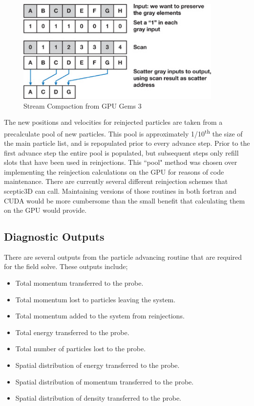 \begin{figure}
\begin{center}
\includegraphics[width=4in]{implementation/stream_compact.jpg}
\end{center}
\caption{Stream Compaction from GPU Gems 3 \cite{Harris2007}}
\label{fig:stream_compact}
\end{figure}



The new positions and velocities for reinjected particles are taken from a precalculate pool of new particles. This pool is approximately 1/10\textsuperscript{th} the size of the main particle list, and is repopulated prior to every advance step. Prior to the first advance step the entire pool is populated, but subsequent steps only refill slots that have been used in reinjections. This ``pool" method was chosen over implementing the reinjection calculations on the GPU for reasons of code maintenance. There are currently several different reinjection schemes that sceptic3D can call. Maintaining versions of those routines in both fortran and CUDA would be more cumbersome than the small benefit that calculating them on the GPU would provide. 

		\subsection{Diagnostic Outputs}
		\label{sec:diagnostic_outputs}
	There are several outputs from the particle advancing routine that are required for the field solve. These outputs include;


\begin{itemize}
\singlespacing
\item Total momentum transferred to the probe.
\item Total momentum lost to particles leaving the system.
\item Total momentum added to the system from reinjections.
\item Total energy transferred to the probe. 
\item Total number of particles lost to the probe. 
\item Spatial distribution of energy transferred to the probe. 
\item Spatial distribution of momentum transferred to the probe. 
\item Spatial distribution of density transferred to the probe. 
\end{itemize}



